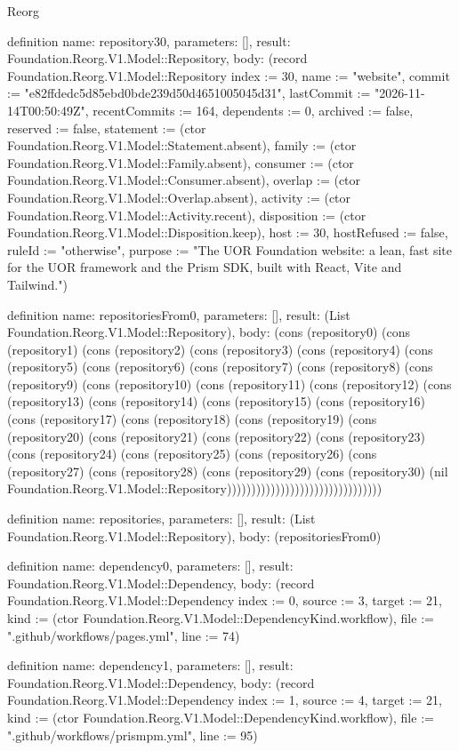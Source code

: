 \begin{lexlean}{Reorg}
\begin{semanticmodule}
definition{
  name: repository30,
  parameters: [],
  result: Foundation.Reorg.V1.Model::Repository,
  body: (record Foundation.Reorg.V1.Model::Repository {index := 30, name := "website", commit := "e82ffdedc5d85ebd0bde239d50d4651005045d31", lastCommit := "2026-11-14T00:50:49Z", recentCommits := 164, dependents := 0, archived := false, reserved := false, statement := (ctor Foundation.Reorg.V1.Model::Statement.absent), family := (ctor Foundation.Reorg.V1.Model::Family.absent), consumer := (ctor Foundation.Reorg.V1.Model::Consumer.absent), overlap := (ctor Foundation.Reorg.V1.Model::Overlap.absent), activity := (ctor Foundation.Reorg.V1.Model::Activity.recent), disposition := (ctor Foundation.Reorg.V1.Model::Disposition.keep), host := 30, hostRefused := false, ruleId := "otherwise", purpose := "The UOR Foundation website: a lean, fast site for the UOR framework and the Prism SDK, built with React, Vite and Tailwind."})
}

definition{
  name: repositoriesFrom0,
  parameters: [],
  result: (List Foundation.Reorg.V1.Model::Repository),
  body: (cons (repository0) (cons (repository1) (cons (repository2) (cons (repository3) (cons (repository4) (cons (repository5) (cons (repository6) (cons (repository7) (cons (repository8) (cons (repository9) (cons (repository10) (cons (repository11) (cons (repository12) (cons (repository13) (cons (repository14) (cons (repository15) (cons (repository16) (cons (repository17) (cons (repository18) (cons (repository19) (cons (repository20) (cons (repository21) (cons (repository22) (cons (repository23) (cons (repository24) (cons (repository25) (cons (repository26) (cons (repository27) (cons (repository28) (cons (repository29) (cons (repository30) (nil Foundation.Reorg.V1.Model::Repository))))))))))))))))))))))))))))))))
}

definition{
  name: repositories,
  parameters: [],
  result: (List Foundation.Reorg.V1.Model::Repository),
  body: (repositoriesFrom0)
}

definition{
  name: dependency0,
  parameters: [],
  result: Foundation.Reorg.V1.Model::Dependency,
  body: (record Foundation.Reorg.V1.Model::Dependency {index := 0, source := 3, target := 21, kind := (ctor Foundation.Reorg.V1.Model::DependencyKind.workflow), file := ".github/workflows/pages.yml", line := 74})
}

definition{
  name: dependency1,
  parameters: [],
  result: Foundation.Reorg.V1.Model::Dependency,
  body: (record Foundation.Reorg.V1.Model::Dependency {index := 1, source := 4, target := 21, kind := (ctor Foundation.Reorg.V1.Model::DependencyKind.workflow), file := ".github/workflows/prismpm.yml", line := 95})
}


\end{semanticmodule}
\end{lexlean}
